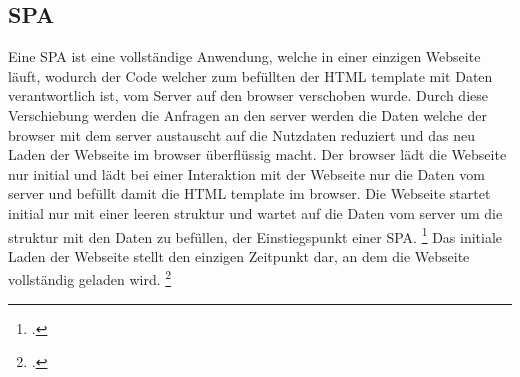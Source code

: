 \subsection{\ac{SPA}}
Eine \ac{SPA} ist eine vollständige Anwendung, welche in einer einzigen Webseite läuft, wodurch der Code welcher zum befüllten der \ac{HTML} \gls{template}
mit Daten verantwortlich ist, vom Server auf den \gls{browser} verschoben wurde.
Durch diese Verschiebung werden die Anfragen an den \gls{server} werden die Daten welche der \gls{browser} mit dem \gls{server} austauscht auf die Nutzdaten reduziert
und das neu Laden der Webseite im \gls{browser} überflüssig macht.
Der \gls{browser} lädt die Webseite nur initial und lädt bei einer Interaktion mit der Webseite nur die Daten vom \gls{server} und befüllt damit die \ac{HTML} \gls{template} im \gls{browser}.
Die Webseite startet initial nur mit einer leeren \gls{struktur} und wartet auf die Daten vom \gls{server} um die \gls{struktur} mit den Daten zu befüllen, der Einstiegspunkt einer \ac{SPA}. \footcite[Vgl.][Seite 23]{Doguhan2020}
Das initiale Laden der Webseite stellt den einzigen Zeitpunkt dar, an dem die Webseite vollständig geladen wird. \footcite[Vgl.][Seite 4 - 8]{Scott2015}